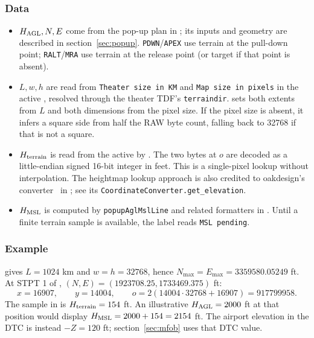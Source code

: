 \documentclass[10pt,a4paper]{amsart}
\begin{document}
\subsubsection*{Data}
\begin{itemize}
\setlength{\itemsep}{0pt}
\setlength{\parsep}{0pt}
\item $H_{\rm AGL},N,E$ come from the pop-up plan in
; its inputs and geometry are described
in section~\ref{sec:popup}. \texttt{PDWN}/\texttt{APEX} use terrain
at the pull-down point; \texttt{RALT}/\texttt{MRA} use terrain at
the release point (or target if that point is absent).
\item $L,w,h$ are read from \texttt{Theater size in KM} and
\texttt{Map size in pixels} in the active
, resolved through the theater TDF's
\texttt{terraindir}. 
sets both extents from $L$ and both dimensions from the pixel size.
If the pixel size is absent, it infers a square side from half the
RAW byte count, falling back to 32768 if that is not a square.
\item $H_{\rm terrain}$ is read from the active
 by
.
The two bytes at $o$ are decoded as a little-endian signed 16-bit
integer in feet. This is a single-pixel lookup without interpolation.
The heightmap lookup approach is also credited to oakdesign's
converter~\cite{oakdesign_converter} in ;
see its \texttt{CoordinateConverter.get\_elevation}.
\item $H_{\rm MSL}$ is computed by \texttt{popupAglMslLine} and
related formatters in . Until a finite
terrain sample is available, the label reads \texttt{MSL pending}.
\end{itemize}

\subsubsection*{Example}
 gives $L=1024$ km
and $w=h=32768$, hence $N_{\max}=E_{\max}=3359580.05249$ ft.
At STPT 1 of ,
$(N,E)=(1923708.25,1733469.375)$ ft:
\[
 x=16907,\qquad y=14004,\qquad
 o=2(14004\cdot32768+16907)=917799958.
\]
The sample in
is $H_{\rm terrain}=154$ ft. An illustrative $H_{\rm AGL}=2000$ ft
at that position would display $H_{\rm MSL}=2000+154=2154$ ft.
The airport elevation in the DTC is instead $-Z=120$ ft;
section~\ref{sec:mfob} uses that DTC value.
\end{document}
